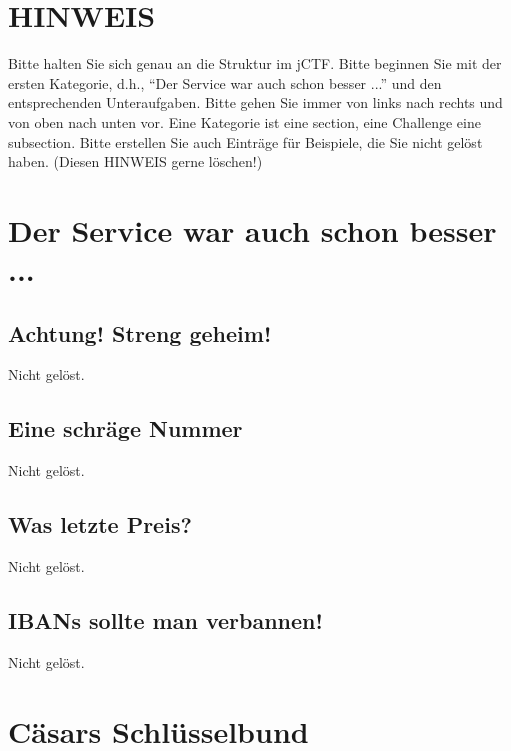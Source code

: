 \documentclass[12pt,a4paper,titlepage,oneside]{scrartcl}
\begin{document}
\maketitle
\setcounter{section}{0}
\setcounter{tocdepth}{2}
\tableofcontents

%
%

\section*{HINWEIS}

Bitte halten Sie sich genau an die Struktur im jCTF. Bitte beginnen Sie mit der ersten Kategorie, d.h., ``Der Service war auch schon besser ...'' und den entsprechenden Unteraufgaben. Bitte gehen Sie immer von links nach rechts und von oben nach unten vor. Eine Kategorie ist eine section, eine Challenge eine subsection. Bitte erstellen Sie auch Einträge für Beispiele, die Sie nicht gelöst haben. (Diesen HINWEIS gerne löschen!)


\section{Der Service war auch schon besser ...}

\subsection{Achtung! Streng geheim!}
Nicht gelöst.

\subsection{Eine schräge Nummer}
Nicht gelöst.

\subsection{Was letzte Preis?}
Nicht gelöst.

\subsection{IBANs sollte man verbannen!}
Nicht gelöst.


\section{C\"asars Schl\"usselbund}
\end{document}
